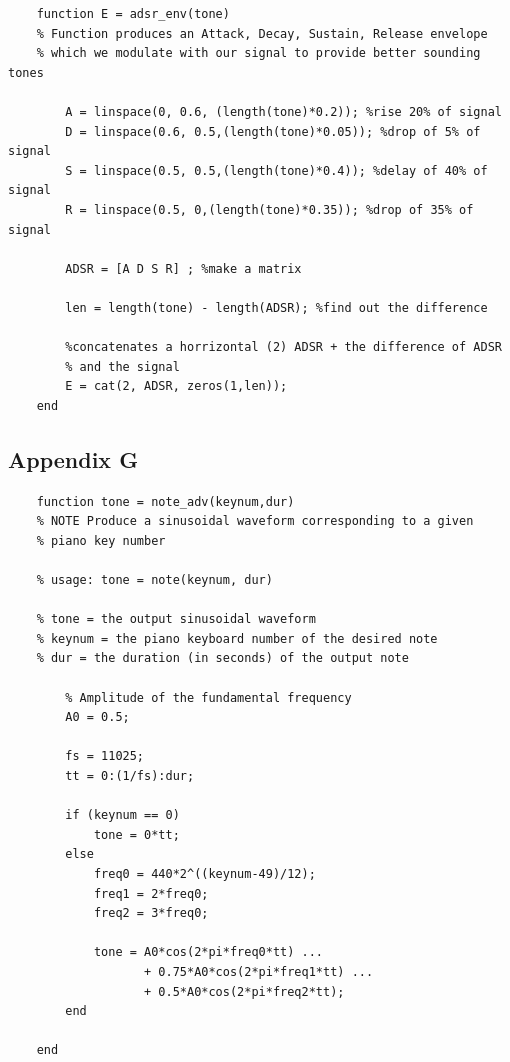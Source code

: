 \documentclass{article}
\begin{document}
\begin{lstlisting}
	function E = adsr_env(tone)
	% Function produces an Attack, Decay, Sustain, Release envelope
	% which we modulate with our signal to provide better sounding tones
	
	    A = linspace(0, 0.6, (length(tone)*0.2)); %rise 20% of signal
	    D = linspace(0.6, 0.5,(length(tone)*0.05)); %drop of 5% of signal
	    S = linspace(0.5, 0.5,(length(tone)*0.4)); %delay of 40% of signal
	    R = linspace(0.5, 0,(length(tone)*0.35)); %drop of 35% of signal
	    
	    ADSR = [A D S R] ; %make a matrix
	
	    len = length(tone) - length(ADSR); %find out the difference
	    
	    %concatenates a horrizontal (2) ADSR + the difference of ADSR
	    % and the signal
	    E = cat(2, ADSR, zeros(1,len));
	end
\end{lstlisting}

\newpage

\subsection{Appendix G}

\begin{lstlisting}
	function tone = note_adv(keynum,dur)
	% NOTE Produce a sinusoidal waveform corresponding to a given
	% piano key number
	
	% usage: tone = note(keynum, dur)
	
	% tone = the output sinusoidal waveform 
	% keynum = the piano keyboard number of the desired note
	% dur = the duration (in seconds) of the output note
	    
	    % Amplitude of the fundamental frequency
	    A0 = 0.5;
	    
	    fs = 11025;
	    tt = 0:(1/fs):dur;
	    
	    if (keynum == 0)
	        tone = 0*tt;
	    else
	        freq0 = 440*2^((keynum-49)/12);
	        freq1 = 2*freq0;
	        freq2 = 3*freq0;
	        
	        tone = A0*cos(2*pi*freq0*tt) ...
	               + 0.75*A0*cos(2*pi*freq1*tt) ...
	               + 0.5*A0*cos(2*pi*freq2*tt);
	    end
	    
	end
\end{lstlisting}
\end{document}
